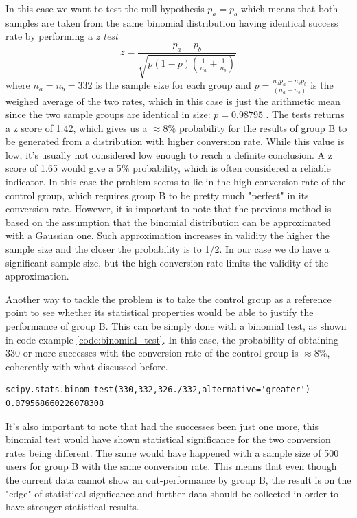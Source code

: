 \documentclass[paper=a4, fontsize=10pt]{report}
\begin{document}
In this case we want to test the null hypothesis $p_{a} = p_{b}$ which means that both samples are taken from the same binomial distribution having identical
 success rate by performing a \textit{z test}
\begin{equation}
 z = \frac{p_{a}-p_{b}}{\sqrt{p(1-p)(\frac{1}{n_{a}} + \frac{1}{n_{b}})}}
\end{equation}
where $n_{a} = n_{b} = 332 $ is the sample size for each group and $ p = \frac{n_{a}p_{a} + n_{b}p_{b}}{ (n_{a} + n_{b})}$ is the weighed average of the two rates,
which in this case is just the arithmetic mean since the two sample groups are identical in size: $p = 0.98795$
. The tests returns a z score of 1.42, which gives us a $\approx 8\%$ probability for the results of group B to be generated from a distribution with higher
conversion rate.
While this value is low, it's usually not considered low enough to reach a definite conclusion. A z score of 1.65 would give a 5$\%$ probability,
which is often considered a reliable indicator. In this case the problem seems to lie in the high conversion rate of the control group,
which requires group B to be pretty much "perfect" in its conversion rate.
However, it is important to note that the previous method is based on the assumption that the binomial distribution can be approximated with a Gaussian one.
Such approximation increases in validity the higher the sample size and the closer the probability is to 1/2. In our case we do have a significant sample size, but the 
high conversion rate limits the validity of the approximation.

Another way to tackle the problem is to take the control group as a reference point to see whether its statistical properties would be
able to justify the performance of group B. This can be simply done with a binomial test, as shown in code example \ref{code:binomial_test}. In this case, 
the probability
of obtaining 330 or more successes with the conversion rate of the control group is $\approx 8\%$, 
coherently with what discussed before.

\footnotesize
\begin{lstlisting}[frame=single,caption= Binomial Test\label{code:binomial_test}]
scipy.stats.binom_test(330,332,326./332,alternative='greater')
0.079568660226078308
\end{lstlisting}
\normalsize

It's also important to note that had the successes been just one more, this binomial test would have shown statistical significance
for the two conversion rates being different. The same would have happened with a sample size of 500 users for group B with the 
same conversion rate.
This means that even though the current data cannot show an out-performance by 
group B, the result is on the "edge" of statistical signficance and further data should be collected in order to have stronger
statistical results.
\end{document}
